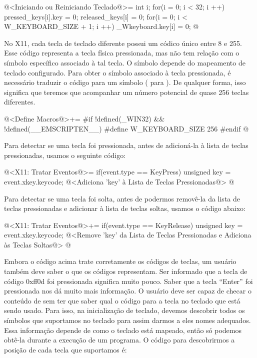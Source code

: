 \iniciocodigo
@<Iniciando ou Reiniciando Teclado@>=
{
  int i;
  for(i = 0; i < 32; i ++){
    pressed_keys[i].key = 0;
    released_keys[i] = 0;
  }
  for(i = 0; i < W_KEYBOARD_SIZE + 1; i ++)
    _Wkeyboard.key[i] = 0;
}
@
\fimcodigo


No X11, cada tecla de teclado diferente possui um códico único entre 8
e 255. Esse código representa a tecla física pressionada, mas não tem
relação com o símbolo específico associado à tal tecla. O símbolo
depende do mapeamento de teclado configurado. Para obter o símbolo
associado à tecla pressionada, é necessário traduzir o código para um
símbolo ( para ). De qualquer
forma, isso significa que teremos que acompanhar um número potencial
de quase 256 teclas diferentes.

\iniciocodigo
@<Define Macros@>+=
#if !defined(_WIN32) && !defined(__EMSCRIPTEN__)
#define W_KEYBOARD_SIZE 256
#endif
@
\fimcodigo

Para detectar se uma tecla foi pressionada, antes de adicioná-la à
lista de teclas pressionadas, usamos o seguinte código:

\iniciocodigo
@<X11: Tratar Eventos@>=
if(event.type == KeyPress){
  unsigned key = event.xkey.keycode;
  @<Adiciona 'key' à Lista de Teclas Pressionadas@>
}
@
\fimcodigo

Para detectar se uma tecla foi solta, antes de podermos removê-la da
lista de teclas pressionadas e adicionar à lista de teclas soltas,
usamos o código abaixo:

\iniciocodigo
@<X11: Tratar Eventos@>+=
if(event.type == KeyRelease){
  unsigned key = event.xkey.keycode;
  @<Remove 'key' da Lista de Teclas Pressionadas e Adiciona às Teclas Soltas@>
}
@
\fimcodigo

Embora o código acima trate corretamente os códigos de teclas, um
usuário também deve saber o que os códigos representam. Ser informado
que a tecla de código 0xff0d foi pressionada significa muito
pouco. Saber que a tecla ``Enter'' foi pressionada nos dá muito mais
informação. O usuário deve ser capaz de checar o conteúdo
de  sem ter que saber qual o código
para a tecla no teclado que está sendo usado. Para isso, na
inicialização de teclado, devemos descobrir todos os símbolos que
suportamos no teclado para assim darmos a eles nomes adequados. Essa
informação depende de como o teclado está mapeado, então só podemos
obtê-la durante a execução de um programa. O código para descobrirmos
a posição de cada tecla que suportamos é:



